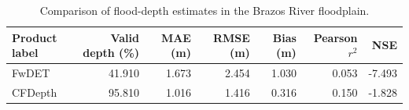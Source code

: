 \begin{table}[htbp]
\centering
\captionsetup{name=Table}
\caption{Comparison of flood-depth estimates in the Brazos River floodplain.}
\label{tab:cfdepth_validation}
\small
\setlength{\tabcolsep}{5pt}
\begin{tabular}{lrrrrrr}
\toprule
Product label & Valid depth (\%) & MAE (m) & RMSE (m) & Bias (m) & Pearson $r^2$ & NSE \\
\midrule
FwDET & 41.910 & 1.673 & 2.454 & 1.030 & 0.053 & -7.493 \\
CFDepth & 95.810 & 1.016 & 1.416 & 0.316 & 0.150 & -1.828 \\
\bottomrule
\end{tabular}
\end{table}
